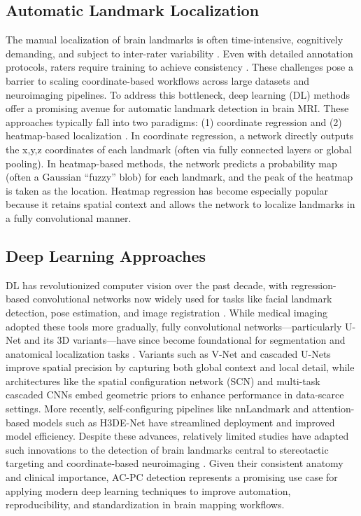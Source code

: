 \subsection{Automatic Landmark Localization}
The manual localization of brain landmarks is often time-intensive, cognitively demanding, and subject to inter-rater variability \cite{Abbass2022-lf, Lau2019-eh,Pallavaram2008-zr}. Even with detailed annotation protocols, raters require training to achieve consistency \cite{Lau2019-eh}. These challenges pose a barrier to scaling coordinate-based workflows across large datasets and neuroimaging pipelines. To address this bottleneck, deep learning (DL) methods offer a promising avenue for automatic landmark detection in brain MRI. These approaches typically fall into two paradigms: (1) coordinate regression \cite{Neupane2024-vt} and (2) heatmap-based localization \cite{Payer2016-ik}. In coordinate regression, a network directly outputs the x,y,z coordinates of each landmark (often via fully connected layers or global pooling). In heatmap-based methods, the network predicts a probability map (often a Gaussian “fuzzy” blob) for each landmark, and the peak of the heatmap is taken as the location. Heatmap regression has become especially popular because it retains spatial context and allows the network to localize landmarks in a fully convolutional manner.

\subsection{Deep Learning Approaches}
DL has revolutionized computer vision over the past decade, with regression-based convolutional networks now widely used for tasks like facial landmark detection, pose estimation, and image registration \cite{Lathuiliere2018-oy}. While medical imaging adopted these tools more gradually, fully convolutional networks—particularly U-Net and its 3D variants—have since become foundational for segmentation and anatomical localization tasks \cite{Akkus2017-eh, Falk2019-us}. Variants such as V-Net and cascaded U-Nets improve spatial precision by capturing both global context and local detail, while architectures like the spatial configuration network (SCN) \cite{Payer2016-ik, Payer2019-sn} and multi-task cascaded CNNs \cite{Zhang2017-dc} embed geometric priors to enhance performance in data-scarce settings. More recently, self-configuring pipelines like nnLandmark \cite{Ertl2025-wu} and attention-based models such as H3DE-Net \cite{Huang2025-vt} have streamlined deployment and improved model efficiency. Despite these advances, relatively limited studies have adapted such innovations to the detection of brain landmarks central to stereotactic targeting and coordinate-based neuroimaging \cite{Edwards2021-su}. Given their consistent anatomy and clinical importance, AC-PC detection represents a promising use case for applying modern deep learning techniques to improve automation, reproducibility, and standardization in brain mapping workflows.

